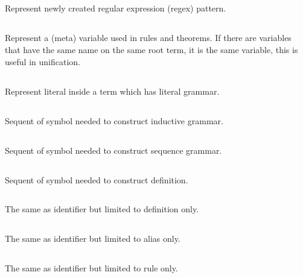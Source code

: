 \documentclass[master.tex]{subfiles}
\begin{document}
\subsection{} Represent newly created regular expression (regex) pattern.

\subsection{} Represent a (meta) variable used in rules and theorems. If there are variables that have the same name on the same root term, it is the same variable, this is useful in unification.

\subsection{} Represent literal inside a term which has literal grammar.

\subsection{} Sequent of symbol needed to construct inductive grammar.

\subsection{} Sequent of symbol needed to construct sequence grammar.

\subsection{} Sequent of symbol needed to construct definition.

\subsection{} The same as identifier but limited to definition only.

\subsection{} The same as identifier but limited to alias only.

\subsection{} The same as identifier but limited to rule only.
\end{document}
